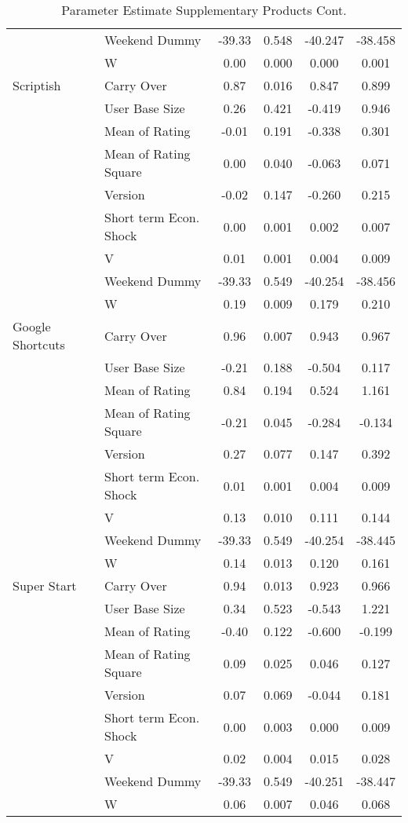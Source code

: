 \documentclass[mksc,nonblindrev]{informs3}
\begin{document}
\begin{table}
\begin{tabular}{llcccc}
	&	Weekend Dummy	&	-39.33	&	0.548	&	-40.247	&	-38.458	\\
	&	W	&	0.00	&	0.000	&	0.000	&	0.001	\\
Scriptish	&	Carry Over	&	0.87	&	0.016	&	0.847	&	0.899	\\
	&	User Base Size	&	0.26	&	0.421	&	-0.419	&	0.946	\\
	&	Mean of Rating	&	-0.01	&	0.191	&	-0.338	&	0.301	\\
	&	Mean of Rating Square	&	0.00	&	0.040	&	-0.063	&	0.071	\\
	&	Version	&	-0.02	&	0.147	&	-0.260	&	0.215	\\
	&	Short term Econ. Shock	&	0.00	&	0.001	&	0.002	&	0.007	\\
	&	V	&	0.01	&	0.001	&	0.004	&	0.009	\\
	&	Weekend Dummy	&	-39.33	&	0.549	&	-40.254	&	-38.456	\\
	&	W	&	0.19	&	0.009	&	0.179	&	0.210	\\
Google Shortcuts	&	Carry Over	&	0.96	&	0.007	&	0.943	&	0.967	\\
	&	User Base Size	&	-0.21	&	0.188	&	-0.504	&	0.117	\\
	&	Mean of Rating	&	0.84	&	0.194	&	0.524	&	1.161	\\
	&	Mean of Rating Square	&	-0.21	&	0.045	&	-0.284	&	-0.134	\\
	&	Version	&	0.27	&	0.077	&	0.147	&	0.392	\\
	&	Short term Econ. Shock	&	0.01	&	0.001	&	0.004	&	0.009	\\
	&	V	&	0.13	&	0.010	&	0.111	&	0.144	\\
	&	Weekend Dummy	&	-39.33	&	0.549	&	-40.254	&	-38.445	\\
	&	W	&	0.14	&	0.013	&	0.120	&	0.161	\\
Super Start	&	Carry Over	&	0.94	&	0.013	&	0.923	&	0.966	\\
	&	User Base Size	&	0.34	&	0.523	&	-0.543	&	1.221	\\
	&	Mean of Rating	&	-0.40	&	0.122	&	-0.600	&	-0.199	\\
	&	Mean of Rating Square	&	0.09	&	0.025	&	0.046	&	0.127	\\
	&	Version	&	0.07	&	0.069	&	-0.044	&	0.181	\\
	&	Short term Econ. Shock	&	0.00	&	0.003	&	0.000	&	0.009	\\
	&	V	&	0.02	&	0.004	&	0.015	&	0.028	\\
	&	Weekend Dummy	&	-39.33	&	0.549	&	-40.251	&	-38.447	\\
	&	W	&	0.06	&	0.007	&	0.046	&	0.068	\\
		\end{tabular}
	\caption{Parameter Estimate Supplementary Products Cont.}
	\label{tab:ParameterEstimateSupplementaryProducts}
\end{table}
\end{document}
